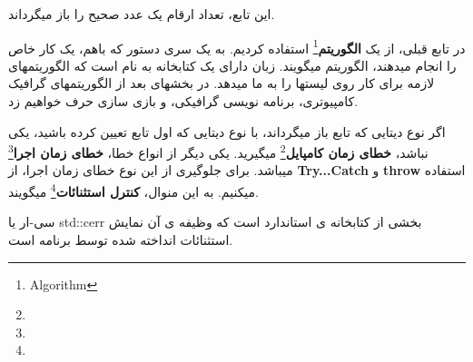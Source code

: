 \documentclass[14pt,a4paper]{memoir}
\begin{document}
	 
	  	 	 \begin{latin}
	 	
	 \end{latin}
	این تابع، تعداد ارقام یک عدد صحیح را باز میگرداند. 
	
	\begin{tip}
		در تابع قبلی، از یک \textbf{الگوریتم}\footnote{Algorithm} استفاده کردیم. به یک سری دستور که باهم، یک کار خاص را انجام میدهند، الگوریتم میگویند. زبان  دارای یک کتابخانه به نام  است که الگوریتمهای لازمه برای کار روی لیستها را به ما میدهد. در بخشهای بعد از الگوریتمهای گرافیک کامپیوتری، برنامه نویسی گرافیکی، و بازی سازی حرف خواهیم زد.
	\end{tip}
	 
	 
	 اگر نوع دیتایی که تابع باز میگرداند، با نوع دیتایی که اول تابع تعیین کرده باشید، یکی نباشد، \textbf{خطای زمان کامپایل}\footnote{} میگیرید. یکی دیگر از انواع خطا، \textbf{خطای زمان اجرا}\footnote{} میباشد. برای جلوگیری از این نوع خطای زمان اجرا، از \textbf{Try...Catch} و \textbf{throw }استفاده میکنیم. به این منوال، \textbf{کنترل استثنائات}\footnote{} میگویند.
	 
	 
	 
		  	 	 \begin{latin}
		
	\end{latin} 
	 
	سی-ار یا std::cerr بخشی از کتابخانه ی استاندارد است که وظیفه ی آن نمایش استثنائات انداخته شده توسط برنامه است.
	
\end{document}
